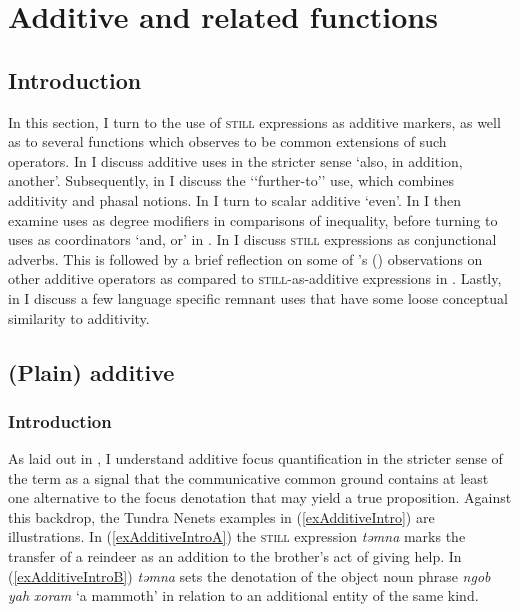 \section{Additive and related functions}\label{sectionAdditiveMain}
\subsection{Introduction} 
In this section, I turn to the use of \textsc{still} expressions as additive markers, as well as to several functions which \textcite{Forker2016} observes to be common extensions of such operators. In  I discuss additive uses in the stricter sense \lq also, in addition, another\rq{}. Subsequently, in  I discuss the \lq\lq{}further-to\rq\rq{ }\parencite{Klein2018} use, which combines additivity and phasal notions. In   I turn to scalar additive \lq even\rq{}. In  I then examine uses as degree modifiers in comparisons of inequality, before turning to uses as coordinators \lq and, or\rq{ }in . In  I discuss \textsc{still} expressions as conjunctional adverbs. This is followed by a brief reflection on some of \citeauthor{Forker2016}'s (\citeyear{Forker2016}) observations on other additive operators as compared to \textsc{still}-as-additive expressions in . Lastly, in  I discuss a few language specific remnant uses that have some loose conceptual similarity to additivity.

\subsection{(Plain) additive}\label{sectionAdditive}
\subsubsection{Introduction} As laid out in , I understand additive focus quantification in the stricter sense of the term as a signal that the communicative common ground contains at least one alternative to the focus denotation that may yield a true proposition. Against this backdrop, the Tundra Nenets examples in (\ref{exAdditiveIntro}) are illustrations. In (\ref{exAdditiveIntroA}) the \textsc{still} expression \textit{təmna} marks the transfer of a reindeer as an addition to the brother's act of giving help. In (\ref{exAdditiveIntroB}) \textit{təmna} sets the denotation of the object noun phrase \textit{ngob} \textit{yah} \textit{xoram} \lq a mammoth\rq{ }in relation to an additional entity of the same kind.

